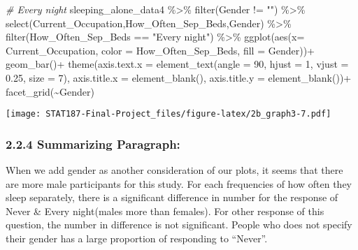 \documentclass[
]{article}
\newenvironment{Shaded}{\begin{snugshade}}{\end{snugshade}}
\newcommand{\AttributeTok}[1]{\textcolor[rgb]{0.77,0.63,0.00}{#1}}
\newcommand{\CommentTok}[1]{\textcolor[rgb]{0.56,0.35,0.01}{\textit{#1}}}
\newcommand{\DecValTok}[1]{\textcolor[rgb]{0.00,0.00,0.81}{#1}}
\newcommand{\FloatTok}[1]{\textcolor[rgb]{0.00,0.00,0.81}{#1}}
\newcommand{\FunctionTok}[1]{\textcolor[rgb]{0.00,0.00,0.00}{#1}}
\newcommand{\NormalTok}[1]{#1}
\newcommand{\SpecialCharTok}[1]{\textcolor[rgb]{0.00,0.00,0.00}{#1}}
\newcommand{\StringTok}[1]{\textcolor[rgb]{0.31,0.60,0.02}{#1}}
\begin{document}
\begin{Shaded}
\begin{Highlighting}[]
\CommentTok{\# Every night}
\NormalTok{sleeping\_alone\_data4 }\SpecialCharTok{\%\textgreater{}\%} \FunctionTok{filter}\NormalTok{(Gender }\SpecialCharTok{!=} \StringTok{""}\NormalTok{) }\SpecialCharTok{\%\textgreater{}\%}
  \FunctionTok{select}\NormalTok{(Current\_Occupation,How\_Often\_Sep\_Beds,Gender) }\SpecialCharTok{\%\textgreater{}\%}
  \FunctionTok{filter}\NormalTok{(How\_Often\_Sep\_Beds }\SpecialCharTok{==} \StringTok{"Every night"}\NormalTok{) }\SpecialCharTok{\%\textgreater{}\%}
  \FunctionTok{ggplot}\NormalTok{(}\FunctionTok{aes}\NormalTok{(}\AttributeTok{x=}\NormalTok{ Current\_Occupation,}
             \AttributeTok{color =}\NormalTok{ How\_Often\_Sep\_Beds,}
             \AttributeTok{fill =}\NormalTok{ Gender))}\SpecialCharTok{+}
  \FunctionTok{geom\_bar}\NormalTok{()}\SpecialCharTok{+}
  \FunctionTok{theme}\NormalTok{(}\AttributeTok{axis.text.x =} \FunctionTok{element\_text}\NormalTok{(}\AttributeTok{angle =} \DecValTok{90}\NormalTok{,}
                                   \AttributeTok{hjust =} \DecValTok{1}\NormalTok{,}
                                   \AttributeTok{vjust =} \FloatTok{0.25}\NormalTok{,}
                                   \AttributeTok{size =} \DecValTok{7}\NormalTok{),}
        \AttributeTok{axis.title.x =} \FunctionTok{element\_blank}\NormalTok{(),}
        \AttributeTok{axis.title.y =} \FunctionTok{element\_blank}\NormalTok{())}\SpecialCharTok{+}
  \FunctionTok{facet\_grid}\NormalTok{(}\SpecialCharTok{\textasciitilde{}}\NormalTok{Gender)}
\end{Highlighting}
\end{Shaded}

\texttt{[image: STAT187-Final-Project\_files/figure-latex/2b\_graph3-7.pdf]}

\hypertarget{summarizing-paragraph-2}{%
\subsubsection{2.2.4 Summarizing
Paragraph:}\label{summarizing-paragraph-2}}

When we add gender as another consideration of our plots, it seems that
there are more male participants for this study. For each frequencies of
how often they sleep separately, there is a significant difference in
number for the response of Never \& Every night(males more than
females). For other response of this question, the number in difference
is not significant. People who does not specify their gender has a large
proportion of responding to ``Never''.
\end{document}

